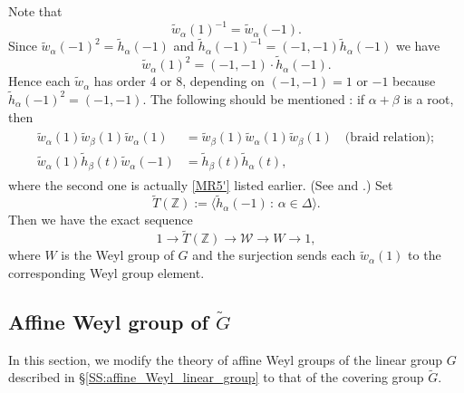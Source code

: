\documentclass[10pt, letterpaper]{amsart}
\theoremstyle{plain}
\theoremstyle{definition}
\numberwithin{equation}{section}
\newcommand{\Z}{\mathbb{Z}}
\newcommand{\wta}{\tilde{w}_{\alpha}}
\newcommand{\hta}{\tilde{h}_{\alpha}}
\newcommand{\wtb}{\tilde{w}_{\beta}}
\newcommand{\htb}{\tilde{h}_{\beta}}
\newcommand{\Gt}{\widetilde{G}}
\newcommand{\Tt}{\widetilde{T}}
\newcommand{\af}{\mathrm{af}}
\newcommand{\ea}{\mathrm{ea}}
\newcommand{\Wcal}{\mathcal{W}}
\newcommand{\la}{\langle}
\newcommand{\ra}{\rangle}
\newcommand{\st}{\,:\,}
\newcommand{\qand}{{\quad\text{and}\quad}}
\begin{document}
Note that
\[
\wta(1)^{-1}=\wta(-1).
\]
Since $\wta(-1)^{2}=\hta(-1)$ and $\hta(-1)^{-1}=(-1,-1)\hta(-1)$ we have
\begin{equation}\label{E:square_of_w}
\wta(1)^2=(-1,-1)\cdot\hta(-1).
\end{equation}
Hence each $\wta$ has order 4 or 8, depending on $(-1,-1)=1$ or $-1$ because $\hta(-1)^2=(-1,-1)$. The following should be mentioned : if $\alpha+\beta$ is a root, then
\begin{gather}\label{E:Savin_relation}
\begin{aligned}
\wta(1)\wtb(1)\wta(1)&=\wtb(1)\wta(1)\wtb(1)\quad\text{(braid relation)};\\
\wta(1)\htb(t)\wta(-1)&=\htb(t)\hta(t),
\end{aligned}
\end{gather}
where the second one is actually \eqref{MR5'} listed earlier. (See \cite[Th\'eor\`eme 6]{Matsumoto} and \cite[Lemma 3.2]{S04}.) Set
\[
\Tt(\Z):=\la\hta(-1)\st\alpha\in\Delta\ra.
\]
Then we have the exact sequence
\begin{equation}\label{E:exact_sequence_of_Weyl_group}
1\longrightarrow \Tt(\Z)\longrightarrow\Wcal\longrightarrow W\longrightarrow 1,
\end{equation}
where $W$ is the Weyl group of $G$ and the surjection sends each $\wta(1)$ to the corresponding Weyl group element.



\subsection{Affine Weyl group of $\Gt$}\label{SS:affine_Weyl_covering_group}

In this section, we modify the theory of affine Weyl groups of the linear group $G$ described in \S \ref{SS:affine_Weyl_linear_group} to that of the covering group $\Gt$.

\end{document}
